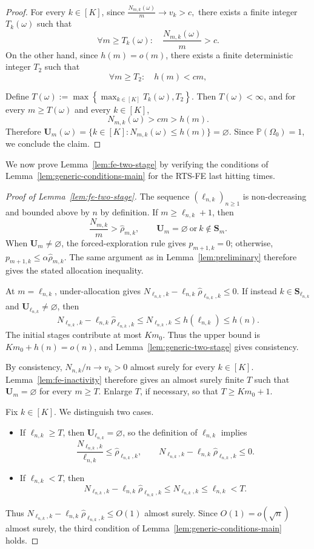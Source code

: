 {\begin{proof}
		For every $k\in[K]$, since
		\(\frac{N_{m,k}(\omega)}{m}\to v_k>c,\)
		there exists a finite integer $T_k(\omega)$ such that
		\[
		\forall m\ge T_k(\omega):
		\quad
		\frac{N_{m,k}(\omega)}{m}>c.
		\]
		On the other hand, since $h(m)=o(m)$,
		there exists a finite deterministic integer $T_2$ such that
		\[
		\forall m\ge T_2
		:\quad
		h(m)<cm,
		\]
		
		Define
		\(
		T(\omega):=\max\left\{\max_{k\in[K]}T_k(\omega),T_2\right\}.
		\)
		Then $T(\omega)<\infty$, and for every $m\ge T(\omega)$ and every
		$k\in[K]$,
		\[
		N_{m,k}(\omega)>cm>h(m).
		\]
		Therefore
		\(
		\mathbf{U}_m(\omega)
		=
		\{k\in[K]:N_{m,k}(\omega)\le h(m)\}
		=
		\varnothing.
		\) Since $\mathbb{P}(\Omega_0)=1$, we conclude the claim.
\end{proof}

We now prove Lemma~\ref{lem:fe-two-stage} by verifying the conditions of Lemma~\ref{lem:generic-conditions-main} for the RTS-FE last hitting times.

\begin{proof}[Proof of Lemma~\ref{lem:fe-two-stage}]
The sequence \((\ell_{n,k})_{n\geq1}\) is non-decreasing and bounded above by \(n\) by definition. If \(m\geq\ell_{n,k}+1\), then
\[
\frac{N_{m,k}}m>\hat\rho_{m,k},
\qquad
\mathbf U_m=\varnothing\ \text{or}\ k\notin\mathbf S_m.
\]
When \(\mathbf U_m\ne\varnothing\), the forced-exploration rule gives \(p_{m+1,k}=0\); otherwise, \(p_{m+1,k}\leq\alpha\hat\rho_{m,k}\). The same argument as in Lemma~\ref{lem:preliminary} therefore gives the stated allocation inequality.

At \(m=\ell_{n,k}\), under-allocation gives
\(N_{\ell_{n,k},k}-\ell_{n,k}\hat\rho_{\ell_{n,k},k}\leq0\).
If instead \(k\in\mathbf S_{\ell_{n,k}}\) and \(\mathbf U_{\ell_{n,k}}\ne\varnothing\), then
\[
N_{\ell_{n,k},k}-\ell_{n,k}\hat\rho_{\ell_{n,k},k}
\leq N_{\ell_{n,k},k}
\leq h(\ell_{n,k})\leq h(n).
\]
The initial stages contribute at most \(Km_0\). Thus the upper bound is \(Km_0+h(n)=o(n)\), and Lemma~\ref{lem:generic-two-stage} gives consistency.

By consistency, \(N_{n,k}/n\to v_k>0\) almost surely for every \(k\in[K]\). Lemma~\ref{lem:fe-inactivity} therefore gives an almost surely finite \(T\) such that \(\mathbf U_m=\varnothing\) for every \(m\geq T\). Enlarge \(T\), if necessary, so that \(T\geq Km_0+1\).

Fix \(k\in[K]\). We distinguish two cases.
\begin{itemize}
\item If \(\ell_{n,k}\geq T\), then \(\mathbf U_{\ell_{n,k}}=\varnothing\), so the definition of \(\ell_{n,k}\) implies
\[
\frac{N_{\ell_{n,k},k}}{\ell_{n,k}}\leq\hat\rho_{\ell_{n,k},k},
\qquad
N_{\ell_{n,k},k}-\ell_{n,k}\hat\rho_{\ell_{n,k},k}\leq0.
\]
\item If \(\ell_{n,k}<T\), then
\[
N_{\ell_{n,k},k}-\ell_{n,k}\hat\rho_{\ell_{n,k},k}
\leq N_{\ell_{n,k},k}\leq\ell_{n,k}<T.
\]
\end{itemize}
Thus \(N_{\ell_{n,k},k}-\ell_{n,k}\hat\rho_{\ell_{n,k},k}\leq O(1)\) almost surely. Since \(O(1)=o(\sqrt n)\) almost surely, the third condition of Lemma~\ref{lem:generic-conditions-main} holds.
\end{proof}

}
